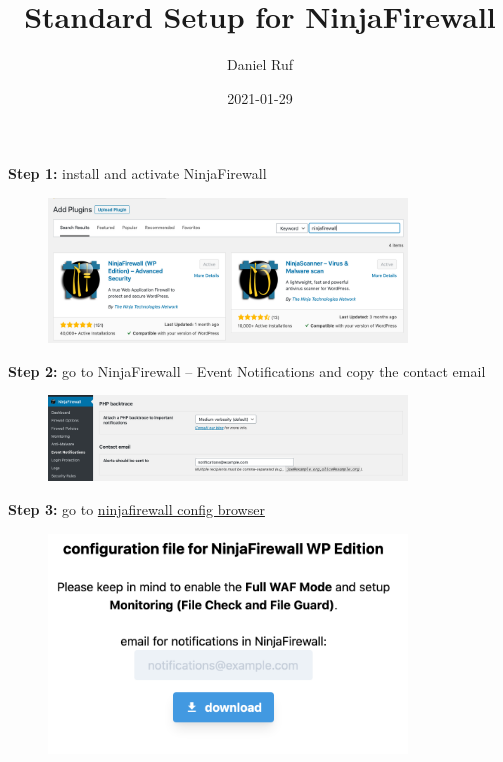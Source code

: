 \documentclass[a4paper]{article}
\title{Standard Setup for NinjaFirewall}\let\Title\@title
\author{Daniel Ruf}\let\Author\@author
\date{2021-01-29} \let\Date\@date
\newcommand{\Version}{1.3}
\begin{document}
\lhead{\Title}
\lfoot{v\Version}
\rfoot{\today}

\noindent


\noindent
\textbf{Step 1:} install and activate NinjaFirewall

\begin{figure}[H]
  \centering
  \includegraphics[width=0.85\textwidth]{images/1.png}
\end{figure}

\noindent
\textbf{Step 2:} go to NinjaFirewall -- Event Notifications and copy the contact email

\begin{figure}[H]
  \centering
  \includegraphics[width=0.85\textwidth]{images/2.png}
\end{figure}

\noindent
\textbf{Step 3:} go to \href{https://danielruf.github.io/ninjafirewall-config-browser/}{ninjafirewall config browser}

\begin{figure}[H]
  \centering
  \includegraphics[width=0.85\textwidth]{images/3.png}
\end{figure}
\end{document}
